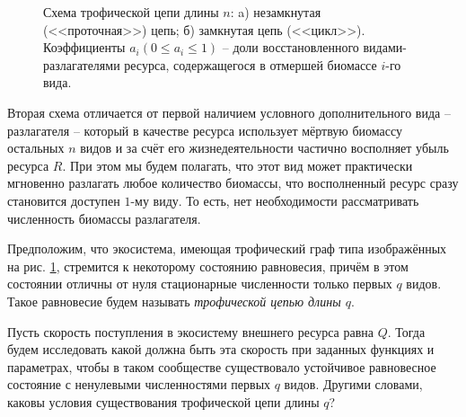 \begin{figure}[H]
\caption{Схема трофической цепи длины \(n\): a) незамкнутая (<<проточная>>) цепь; б) замкнутая цепь (<<цикл>>). Коэффициенты \(a_i (0 \leq a_i \leq 1)\) -- доли восстановленного видами-разлагателями ресурса, содержащегося в отмершей биомассе \(i\)-го вида.} \label{shemas}
\end{figure}

Вторая схема отличается от первой наличием условного дополнительного вида -- разлагателя -- который в качестве ресурса использует мёртвую биомассу остальных \(n\) видов и за счёт его жизнедеятельности частично восполняет убыль ресурса \(R\). При этом мы будем полагать, что этот вид может практически мгновенно разлагать любое количество биомассы, что восполненный ресурс сразу становится доступен \(1\)-му виду. То есть, нет необходимости рассматривать численность биомассы разлагателя.

Предположим, что экосистема, имеющая трофический граф типа изображённых на рис. \ref{shemas}, стремится к некоторому состоянию равновесия, причём в этом состоянии отличны от нуля стационарные численности только первых \(q\) видов. Такое равновесие будем называть \textit{трофической цепью длины \(q\)}. 

Пусть скорость поступления в экосистему внешнего ресурса равна \(Q\). Тогда будем исследовать какой должна быть эта скорость при заданных функциях и параметрах, чтобы в таком сообществе существовало устойчивое равновесное состояние с ненулевыми численностями первых \(q\) видов. Другими словами, каковы условия существования трофической цепи длины \(q\)?

